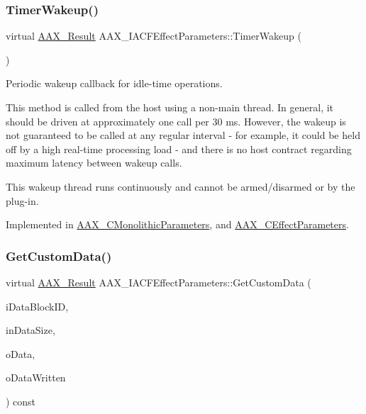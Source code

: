 \subsubsection{\texorpdfstring{TimerWakeup()}{TimerWakeup()}}
{\footnotesize\ttfamily virtual \mbox{\hyperlink{a00392_a4d8f69a697df7f70c3a8e9b8ee130d2f}{A\+A\+X\+\_\+\+Result}} A\+A\+X\+\_\+\+I\+A\+C\+F\+Effect\+Parameters\+::\+Timer\+Wakeup (\begin{DoxyParamCaption}{ }\end{DoxyParamCaption})\hspace{0.3cm}{\ttfamily [pure virtual]}}



Periodic wakeup callback for idle-\/time operations. 

This method is called from the host using a non-\/main thread. In general, it should be driven at approximately one call per 30 ms. However, the wakeup is not guaranteed to be called at any regular interval -\/ for example, it could be held off by a high real-\/time processing load -\/ and there is no host contract regarding maximum latency between wakeup calls.

This wakeup thread runs continuously and cannot be armed/disarmed or by the plug-\/in. 

Implemented in \mbox{\hyperlink{a01969_ac3f92841efe2d864ffefce94b7ae27b4}{A\+A\+X\+\_\+\+C\+Monolithic\+Parameters}}, and \mbox{\hyperlink{a01481_a4e1dc0e4b966fe80041d67814d13e03d}{A\+A\+X\+\_\+\+C\+Effect\+Parameters}}.

\mbox{\label{a01669_a4728fcad006d921a07489144360f447e}} 
\subsubsection{\texorpdfstring{GetCustomData()}{GetCustomData()}}
{\footnotesize\ttfamily virtual \mbox{\hyperlink{a00392_a4d8f69a697df7f70c3a8e9b8ee130d2f}{A\+A\+X\+\_\+\+Result}} A\+A\+X\+\_\+\+I\+A\+C\+F\+Effect\+Parameters\+::\+Get\+Custom\+Data (\begin{DoxyParamCaption}\item[{\mbox{\hyperlink{a00392_ac678f9c1fbcc26315d209f71a147a175}{A\+A\+X\+\_\+\+C\+Type\+ID}}}]{i\+Data\+Block\+ID,  }\item[{uint32\+\_\+t}]{in\+Data\+Size,  }\item[{void $\ast$}]{o\+Data,  }\item[{uint32\+\_\+t $\ast$}]{o\+Data\+Written }\end{DoxyParamCaption}) const\hspace{0.3cm}{\ttfamily [pure virtual]}}



